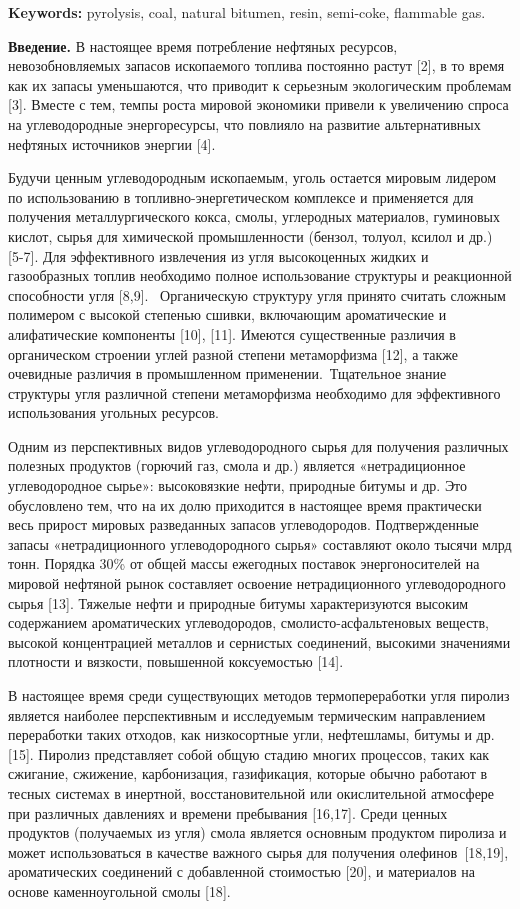 {\bfseries Keywords:} pyrolysis, coal, natural bitumen, resin, semi-coke,
flammable gas.

\begin{multicols}{2}
{\bfseries Введение.} В настоящее время потребление нефтяных ресурсов,
невозобновляемых запасов ископаемого топлива постоянно растут {[}2{]}, в
то время как их запасы уменьшаются, что приводит к серьезным
экологическим проблемам {[}3{]}. Вместе с тем, темпы роста мировой
экономики привели к увеличению спроса на углеводородные энергоре­сурсы,
что повлияло на развитие альтернативных нефтяных источников энергии
{[}4{]}.

Будучи ценным углеводородным ископаемым, уголь остается мировым лидером
по использованию в топливно-энергетическом комплексе и применяется для
получения металлургического кокса, смолы, углеродных материалов,
гуминовых кислот, сырья для химической промышленности (бензол, толуол,
ксилол и др.) {[}5-7{]}. Для эффективного извлечения из угля
высокоценных жидких и газообразных топлив необходимо полное
использование структуры и реакционной способности угля {[}8,9{]}.~
Органическую структуру угля принято считать сложным полимером с высокой
степенью сшивки, включающим ароматические и алифатические компоненты
{[}10{]}, {[}11{]}. Имеются существенные различия в органическом
строении углей разной степени метаморфизма {[}12{]}, а также очевидные
различия в промышленном применении.~Тщательное знание структуры угля
различной степени метаморфизма необходимо для эффективного использования
угольных ресурсов.

Одним из перспективных видов углеводородного сырья для получения
различных полезных продуктов (горючий газ, смола и др.) является
«нетрадиционное углеводородное сырье»: высоковязкие нефти, природные
битумы и др. Это обусловлено тем, что на их долю приходится в настоящее
время практически весь прирост мировых разведанных запасов
углеводородов. Подтвержденные запасы «нетрадиционного углеводородного
сырья» составляют около тысячи млрд тонн. Порядка 30\% от общей массы
ежегодных поставок энергоносителей на мировой нефтяной рынок составляет
освоение нетрадиционного углеводородного сырья {[}13{]}. Тяжелые нефти и
природные битумы характеризуются высоким содержанием ароматиче­ских
углеводородов, смолисто-ас­фальтеновых веществ, высокой кон­центрацией
металлов и сернистых соединений, высокими значениями плотности и
вязкости, повышенной коксуемостью {[}14{]}.

В настоящее время среди существующих методов термопереработки угля
пиролиз является наиболее перспективным и исследуемым термическим
направлением переработки таких отходов, как низкосортные угли,
нефтешламы, битумы и др. {[}15{]}. Пиролиз представляет собой общую
стадию многих процессов, таких как сжигание, сжижение, карбонизация,
газификация, которые обычно работают в тесных системах в инертной,
восстановительной или окислительной атмосфере при различных давлениях и
времени пребывания {[}16,17{]}. Среди ценных продуктов (получаемых из
угля) смола является основным продуктом пиролиза и может использоваться
в качестве важного сырья для получения олефинов~{[}18,19{]},
ароматических соединений с добавленной стоимостью {[}20{]}, и материалов
на основе каменноугольной смолы {[}18{]}.~


\end{multicols}
